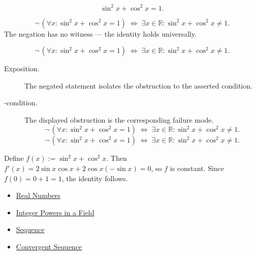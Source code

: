 \begin{remark*}
\[
  \sin^2 x+\cos^2 x=1.
\]
\end{remark*}

\begin{remark*}
\[
  \neg\,(\forall x:\sin^2 x+\cos^2 x=1)
  \;\iff\;
  \exists x\in\mathbb{R}:\sin^2 x+\cos^2 x\neq 1.
\]
The negation has no witness --- the identity holds universally.
\end{remark*}

\begin{remark*}
\[
\neg\,(\forall x:\sin^2 x+\cos^2 x=1)
  \;\iff\;
  \exists x\in\mathbb{R}:\sin^2 x+\cos^2 x\neq 1.
\]
\end{remark*}

\begin{remark*}
\begin{description}
  \item[Exposition.]
  The negated statement isolates the obstruction to the asserted condition.

  \item[\neq-condition.]
  The displayed obstruction is the corresponding failure mode.
  \[
\neg\,(\forall x:\sin^2 x+\cos^2 x=1)
  \;\iff\;
  \exists x\in\mathbb{R}:\sin^2 x+\cos^2 x\neq 1.
  \]
  \[
\neg\,(\forall x:\sin^2 x+\cos^2 x=1)
  \;\iff\;
  \exists x\in\mathbb{R}:\sin^2 x+\cos^2 x\neq 1.
  \]
\end{description}
\end{remark*}



\begin{remark*}[Interpretation]
Define $f(x) := \sin^2 x + \cos^2 x$. Then $f'(x) = 2\sin x \cos x
+ 2\cos x(-\sin x) = 0$, so $f$ is constant. Since $f(0) = 0 + 1 =
1$, the identity follows.
\end{remark*}

\begin{dependencies}
\begin{itemize}
  \item \hyperref[def:reals]{Real Numbers}
  \item \hyperref[def:two-sided-inverse]{Integer Powers in a Field}
  \item \hyperref[def:sequence]{Sequence}
  \item \hyperref[def:convergent-sequence]{Convergent Sequence}
\end{itemize}
\end{dependencies}

